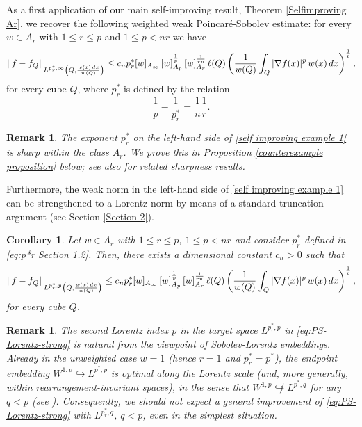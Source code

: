 \documentclass[reqno, 10pt, oneside]{amsart}
\numberwithin{equation}{section}
\newcommand{\strt}[1]{\rule{0pt}{#1}}
\newtheorem{corollary}[theorem]{Corollary}
\newtheorem{remark}[theorem]{Remark}
\numberwithin{theorem}{section}
\newcommand{\norm}[1]{\left\|#1\right\|}
\newcommand{\1}{{\rm 1\hspace*{-0.4ex}%
\rule{0.1ex}{1.52ex}\hspace*{0.2ex}}}
\begin{document}
As a first application of our main self-improving result, Theorem \ref{Selfimproving Ar}, we recover the following weighted weak Poincaré-Sobolev estimate: for every $w\in A_r$ with $1\le r\le p$ and $1\le p <nr$ we have 
%
\begin{equation}\label{self improving example 1}
	\norm{f-f_Q}_{\strt{2.3ex} L^{p_r^{*},\infty}\left(Q, \frac{w(x)\,dx}{w(Q)}\right)} \le c_n p^*_r [w]_{A_\infty}\,[w]_{A_p}^{\frac{1}{p}}\,[w]_{A_r}^{\frac{1}{rn}}\, \ell(Q) \left( \frac{1}{w(Q)}\int_{Q}|\nabla f(x)|^p\, w(x)\,dx\right)^{\frac{1}{p}},
\end{equation}
for every cube $Q$, where $p^*_r$ is defined by the relation
\begin{equation}\label{eq:p*r Section 1.2}
	\frac{1}{p}-\frac{1}{p_r^{*}}=\frac{1}{n }\frac{1}{r}.
\end{equation}



\begin{remark}
The exponent $p_r^{*}$ on the left-hand side of \eqref{self improving example 1} is sharp within the class $A_r$. We prove this in Proposition \ref{counterexample proposition} below; see also \cite[Theorem 2.17]{ClarosJFA} for related sharpness results.
\end{remark}


Furthermore, the weak norm in the left-hand side of \eqref{self improving example 1} can be strengthened to a Lorentz norm by means of a standard truncation argument (see Section \ref{Section 2}).

\begin{corollary}\label{thm:PS-Lorentz-strong} 
Let $w\in A_r$ with $1\le r\le p$, $1\le p< nr$ and consider $p_r^{*}$ defined in \eqref{eq:p*r Section 1.2}. Then, there exists a dimensional constant $c_n>0$ such that 
\begin{equation}\label{eq:PS-Lorentz-strong}
	\|f-f_{Q}\|_{\strt{2.3ex}L^{p_r^{*},p}\left(Q, \frac{w(x)\,dx}{w(Q)}\right)} \le c_n p^*_r [w]_{A_\infty}\,[w]_{A_p}^{\frac{1}{p}}\,[w]_{A_r}^{\frac{1}{rn}}\, \ell(Q) \left( \frac{1}{w(Q)}\int_{Q}|\nabla f(x)|^p\, w(x)\,dx\right)^{\frac{1}{p}},
\end{equation}
for every cube $Q$. 
\end{corollary}


\begin{remark}{\label{remark of the sharpness on Lorentz}}
The second Lorentz index $p$ in the target space $L^{p_r^{*},p}$ in \eqref{eq:PS-Lorentz-strong} is natural from the viewpoint of Sobolev-Lorentz embeddings. Already in the unweighted case $w=1$ (hence $r=1$ and $p_r^{*}=p^*$), the endpoint embedding $W^{1,p}\hookrightarrow L^{p^*,p}$ is optimal along the Lorentz scale (and, more generally, within rearrangement-invariant spaces), in the sense that $W^{1,p}\not\hookrightarrow L^{p^*,q}$ for any $q<p$ (see \cite{EKP}). Consequently, we should not expect a general improvement of \eqref{eq:PS-Lorentz-strong} with $L^{p_r^{*},q}$, $q<p$, even in the simplest situation.
\end{remark}
\end{document}
